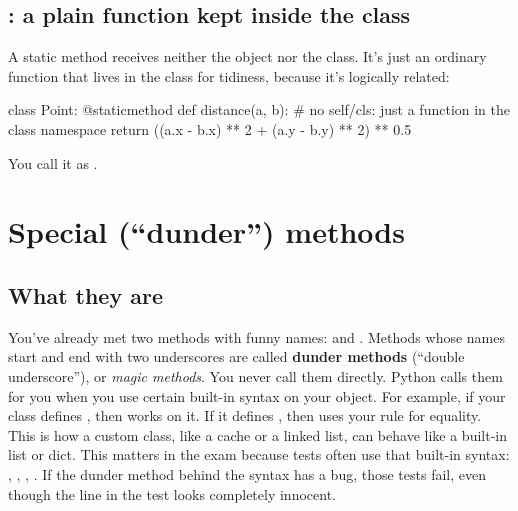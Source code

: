 \documentclass[10pt,a4paper]{article}
\begin{document}
\subsection{: a plain function kept inside the class}
A static method receives neither the object nor the class. It’s just an ordinary function that lives in the class for tidiness, because it’s logically related:
\begin{pycode}
class Point:
    @staticmethod
    def distance(a, b):          # no self/cls: just a function in the class namespace
        return ((a.x - b.x) ** 2 + (a.y - b.y) ** 2) ** 0.5
\end{pycode}
You call it as .
\setcounter{section}{4}
\section{Special (“dunder”) methods}
\subsection{What they are}
You’ve already met two methods with funny names:  and . Methods whose names start and end with two underscores are called \textbf{dunder methods} (“double underscore”), or \emph{magic methods}. You never call them directly. Python calls them for you when you use certain built-in syntax on your object.
For example, if your class defines , then  works on it. If it defines , then  uses your rule for equality. This is how a custom class, like a cache or a linked list, can behave like a built-in list or dict.
This matters in the exam because tests often use that built-in syntax: , , , . If the dunder method behind the syntax has a bug, those tests fail, even though the line in the test looks completely innocent.
\end{document}
